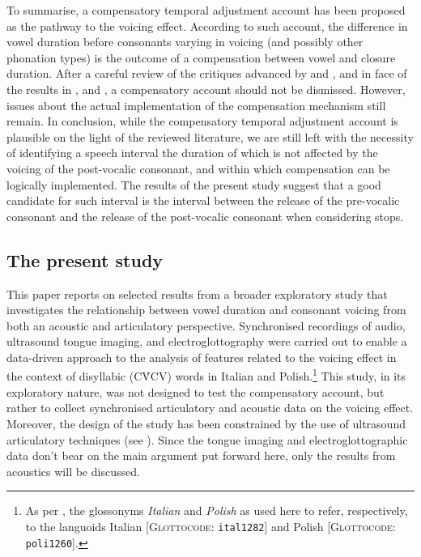 \documentclass[12pt,]{article}
\let\rmarkdownfootnote\footnote%
\def\footnote{\protect\rmarkdownfootnote}
\begin{document}
To summarise, a compensatory temporal adjustment account has been
proposed as the pathway to the voicing effect. According to such
account, the difference in vowel duration before consonants varying in
voicing (and possibly other phonation types) is the outcome of a
compensation between vowel and closure duration. After a careful review
of the critiques advanced by \citet{chen1970} and \citet{maddieson1976},
and in face of the results in \citet{slis1969}, \citet{de-jong1991} and
\citet{begus2017}, a compensatory account should not be dismissed.
However, issues about the actual implementation of the compensation
mechanism still remain. In conclusion, while the compensatory temporal
adjustment account is plausible on the light of the reviewed literature,
we are still left with the necessity of identifying a speech interval
the duration of which is not affected by the voicing of the post-vocalic
consonant, and within which compensation can be logically implemented.
The results of the present study suggest that a good candidate for such
interval is the interval between the release of the pre-vocalic
consonant and the release of the post-vocalic consonant when considering
stops.

\hypertarget{the-present-study}{%
\subsection{The present study}\label{the-present-study}}

This paper reports on selected results from a broader exploratory study
that investigates the relationship between vowel duration and consonant
voicing from both an acoustic and articulatory perspective. Synchronised
recordings of audio, ultrasound tongue imaging, and electroglottography
were carried out to enable a data-driven approach to the analysis of
features related to the voicing effect in the context of disyllabic
(CV́CV) words in Italian and
Polish.\footnote{As per \citet{cysouw2013}, the glossonyms \textit{Italian} and \textit{Polish} as used here to refer, respectively, to the languoids Italian [\textsc{Glottocode}: \texttt{ital1282}] and Polish [\textsc{Glottocode}: \texttt{poli1260}].}
This study, in its exploratory nature, was not designed to test the
compensatory account, but rather to collect synchronised articulatory
and acoustic data on the voicing effect. Moreover, the design of the
study has been constrained by the use of ultrasound articulatory
techniques (see ). Since the tongue imaging and
electroglottographic data don't bear on the main argument put forward
here, only the results from acoustics will be discussed.
\end{document}
